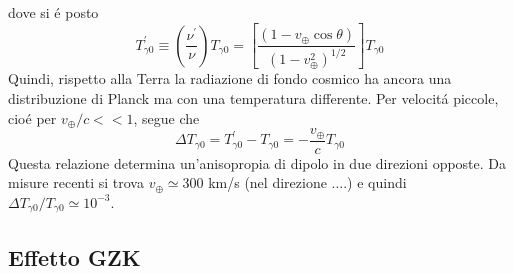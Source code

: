 dove si \'e posto
\begin{equation}
T^{\prime}_{\gamma 0} \equiv \left( \frac{\nu ^{\prime}}{\nu} \right) T_{\gamma 0} =
\left[ \frac{(1- v_{\oplus} \cos \theta)}{(1-v_{\oplus}^2)^{1/2} } \right] T_{\gamma 0}
\end{equation}
Quindi, rispetto alla Terra la radiazione di fondo cosmico ha ancora una distribuzione di Planck
ma con una temperatura differente.
Per velocit\'a piccole, cio\'e per $v_{\oplus}/c << 1$, segue che
\begin{equation}
\Delta T_{\gamma 0} = T^{\prime}_{\gamma 0} - T_{\gamma 0} = - \frac{ v_{\oplus}} {c} T_{\gamma 0}
\end{equation}
Questa relazione determina un'anisopropia di dipolo in due direzioni opposte.
Da misure recenti si trova $v_{\oplus} \simeq 300$ km/s (nel direzione ....) e quindi
$  \Delta T_{\gamma 0} / T_{\gamma 0} \simeq 10^{-3}$.

\subsection{Effetto GZK}

